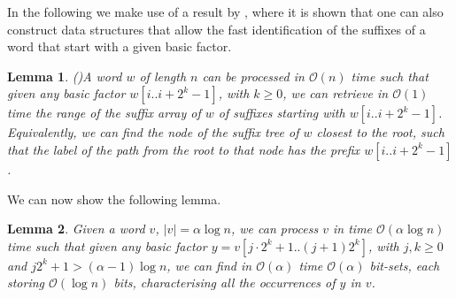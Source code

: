 \documentclass[final]{dmtcs-episciences}
\newcommand{\bigo}{{\mathcal O}}
\newtheorem{lemma}{Lemma}
\begin{document}
In the following we make use of a result by \cite{Gawrychowski11}, where it is shown that one can also construct data structures that allow the fast identification of the suffixes of a word that start with a given basic factor.
\begin{lemma}(\cite{Gawrychowski11})\label{find_node}
A word $w$ of length $n$ can be processed in $\bigo(n)$ time such that given any basic factor $w[i..i+2^k-1]$, with $k\geq 0$, we can retrieve in $\bigo(1)$ time the range of the suffix array of $w$ of suffixes starting with $w[i..i+2^k-1]$. Equivalently, we can find the node of the suffix tree of $w$ closest to the root, such that the label of the path from the root to that node has the prefix $w[i..i+2^k-1]$.
\end{lemma}
We can now show the following lemma. 
\begin{lemma}\label{find_occ_small}
Given a word $v$, $|v|=\alpha \log n$, we can process $v$ in time $\bigo(\alpha \log n)$ time such that given any basic factor $y=v[j\cdot2^k+1..(j+1)2^{k}]$, with $j,k\geq 0$ and $j2^k+1> (\alpha-1)\log n$, we can find in $\bigo(\alpha)$ time $\bigo(\alpha)$ bit-sets, each storing $\bigo(\log n)$ bits, characterising all the occurrences of $y$ in $v$.
\end{lemma}
\end{document}
